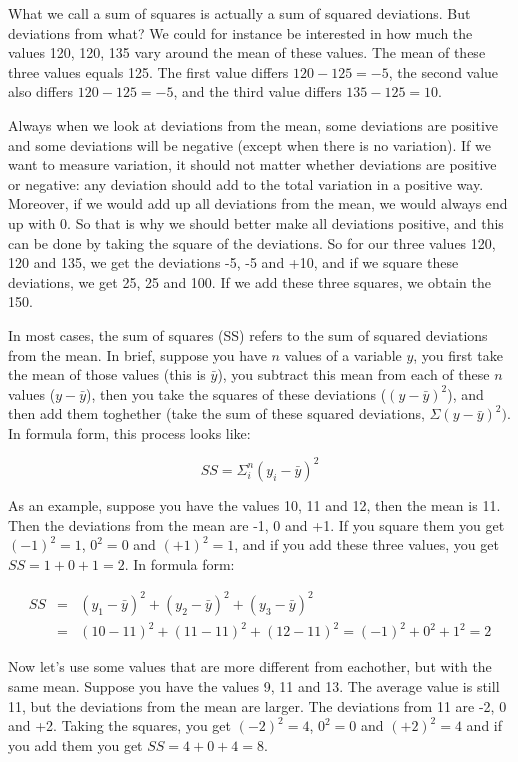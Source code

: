 \documentclass[]{report}\usepackage[]{graphicx}\usepackage[]{color}
\begin{document}
What we call a sum of squares is actually a sum of squared deviations. But deviations from what? We could for instance be interested in how much the values 120, 120, 135 vary around the mean of these values. The mean of these three values equals 125. The first value differs $120-125= -5$, the second value also differs $120-125= -5$, and the third value differs $135-125= 10$.

Always when we look at deviations from the mean, some deviations are positive and some deviations will be negative (except when there is no variation). If we want to measure variation, it should not matter whether deviations are positive or negative: any deviation should add to the total variation in a positive way. Moreover, if we would add up all deviations from the mean, we would always end up with 0. So that is why we should better make all deviations positive, and this can be done by taking the square of the deviations. So for our three values 120, 120 and 135, we get the deviations -5, -5 and +10, and if we square these deviations, we get 25, 25 and 100. If we add these three squares, we obtain the 150.

In most cases, the sum of squares (SS) refers to the sum of squared deviations from the mean. In brief, suppose you have $n$ values of a variable $y$, you first take the mean of those values (this is $\bar{y}$), you subtract this mean from each of these $n$ values ($y-\bar{y}$), then you take the squares of these deviations ($(y-\bar{y})^2$), and then add them toghether (take the sum of these squared deviations, $\Sigma (y-\bar{y})^2)$. In formula form, this process looks like:

\begin{equation}
SS = \Sigma_i^n (y_i-\bar{y})^2
\end{equation}

As an example, suppose you have the values 10, 11 and 12, then the mean is 11. Then the deviations from the mean are -1, 0 and +1. If you square them you get $(-1)^2=1$, $0^2=0$ and $(+1)^2=1$, and if you add these three values, you get $SS=1+0+1=2$. In formula form:


\begin{eqnarray}
SS &=& (y_1-\bar{y})^2 + (y_2-\bar{y})^2 +(y_3-\bar{y})^2 \\
&=& (10-11)^2 + (11-11)^2 +(12-11)^2 = (-1)^2 + 0^2 + 1^2=2 \nonumber
\end{eqnarray}

Now let's use some values that are more different from eachother, but with the same mean. Suppose you have the values 9, 11 and 13. The average value is still 11, but the deviations from the mean are larger. The deviations from 11 are -2, 0 and +2. Taking the squares, you get $(-2)^2=4$, $0^2=0$ and $(+2)^2=4$ and if you add them you get $SS=4+0+4=8$.
\end{document}
